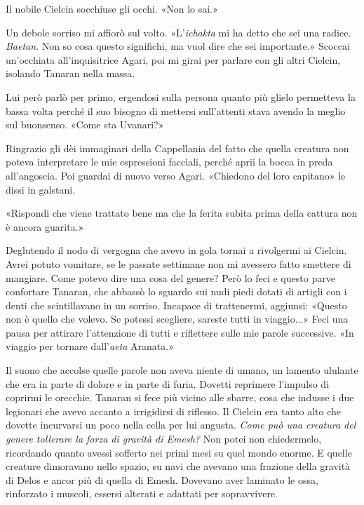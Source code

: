 Il nobile Cielcin socchiuse gli occhi. «Non lo sai.»

Un debole sorriso mi affiorò sul volto. «L'\emph{ichakta} mi ha detto
che sei una radice. \emph{Baetan}. Non so cosa questo significhi, ma
vuol dire che sei importante.» Scoccai un'occhiata all'inquisitrice
Agari, poi mi girai per parlare con gli altri Cielcin, isolando Tanaran
nella massa.

Lui però parlò per primo, ergendosi sulla persona quanto più glielo
permetteva la bassa volta perché il suo bisogno di mettersi sull'attenti
stava avendo la meglio sul buonsenso. «Come sta Uvanari?»

Ringrazio gli dèi immaginari della Cappellania del fatto che quella
creatura non poteva interpretare le mie espressioni facciali, perché
aprii la bocca in preda all'angoscia. Poi guardai di nuovo verso Agari.
«Chiedono del loro capitano» le dissi in galstani.

«Rispondi che viene trattato bene ma che la ferita subita prima della
cattura non è ancora guarita.»

Deglutendo il nodo di vergogna che avevo in gola tornai a rivolgermi ai
Cielcin. Avrei potuto vomitare, se le passate settimane non mi avessero
fatto smettere di mangiare. Come potevo dire una cosa del genere? Però
lo feci e questo parve confortare Tanaran, che abbassò lo sguardo sui
nudi piedi dotati di artigli con i denti che scintillavano in un
sorriso. Incapace di trattenermi, aggiunsi: «Questo non è quello che
volevo. Se potessi scegliere, sareste tutti in viaggio...» Feci una
pausa per attirare l'attenzione di tutti e riflettere sulle mie parole
successive. «In viaggio per tornare dall'\emph{aeta} Aranata.»

Il suono che accolse quelle parole non aveva niente di umano, un lamento
ululante che era in parte di dolore e in parte di furia. Dovetti
reprimere l'impulso di coprirmi le orecchie. Tanaran si fece più vicino
alle sbarre, cosa che indusse i due legionari che avevo accanto a
irrigidirsi di riflesso. Il Cielcin era tanto alto che dovette
incurvarsi un poco nella cella per lui angusta. \emph{Come può una
	creatura del genere tollerare la forza di gravità di Emesh?} Non potei
non chiedermelo, ricordando quanto avessi sofferto nei primi mesi su
quel mondo enorme. E quelle creature dimoravano nello spazio, su navi
che avevano una frazione della gravità di Delos e ancor più di quella di
Emesh. Dovevano aver laminato le ossa, rinforzato i muscoli, essersi
alterati e adattati per sopravvivere.

